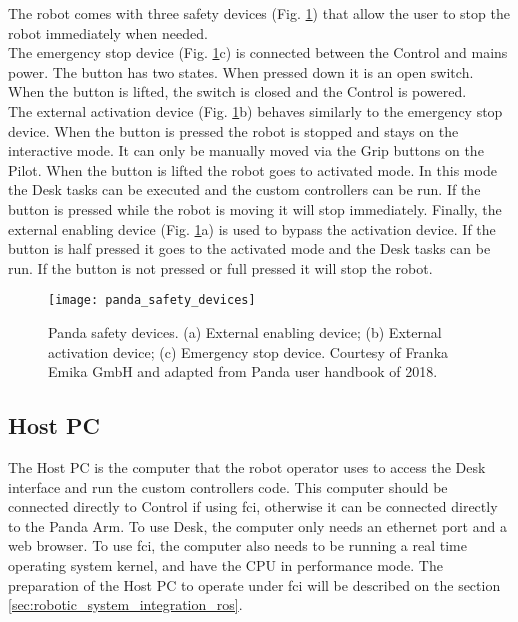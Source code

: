 The robot comes with three safety devices (Fig. \ref{fig:panda_safety_devices}) that allow the user to stop the robot immediately when needed. \\
The emergency stop device (Fig. \ref{fig:panda_safety_devices}c) is connected between the Control and mains power. The button has two states. When pressed down it is an open switch. When the button is lifted, the switch is closed and the Control is powered. \\
The external activation device (Fig. \ref{fig:panda_safety_devices}b) behaves similarly to the emergency stop device. When the button is pressed the robot is stopped and stays on the interactive mode. It can only be manually moved via the Grip buttons on the Pilot. When the button is lifted the robot goes to activated mode. In this mode the Desk tasks can be executed and the custom controllers can be run. If the button is pressed while the robot is moving it will stop immediately.
Finally, the external enabling device (Fig. \ref{fig:panda_safety_devices}a) is used to bypass the activation device. If the button is half pressed it goes to the activated mode and the Desk tasks can be run. If the button is not pressed or full pressed it will stop the robot.

\begin{figure}[htbp]
    \centering
	\texttt{[image: panda\_safety\_devices]}
	\caption{Panda safety devices. (a) External enabling device; (b) External activation device; (c) Emergency stop device. Courtesy of Franka Emika GmbH and adapted from Panda user handbook of 2018.}
	\label{fig:panda_safety_devices}
\end{figure}


\subsection*{Host PC}
\label{subsec:robotic_system_physical_description_hostpc}

The Host PC is the computer that the robot operator uses to access the Desk interface and run the custom controllers code. This computer should be connected directly to Control if using \gls{fci}, otherwise it can be connected directly to the Panda Arm. To use Desk, the computer only needs an ethernet port and a web browser. To use \gls{fci}, the computer also needs to be running a real time operating system kernel, and have the CPU in performance mode. The preparation of the Host PC to operate under \gls{fci} will be described on the section \ref{sec:robotic_system_integration_ros}.

